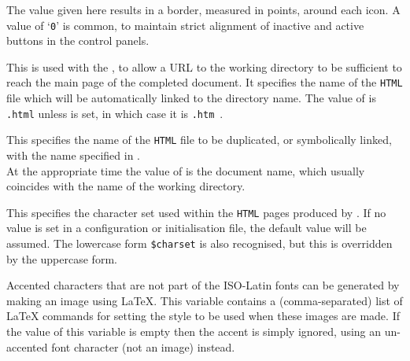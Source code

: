 \begin{htmllist}
\item [\fn{\$NAV\_BORDER}\texttt{ = }\Meta{num}\texttt{;}]
The value given here results in a border, measured in points, around each icon.\html{\\}
A value of `\texttt{0}' is common, to maintain strict
alignment of inactive and active buttons in the control panels.


\begin{changebar}
\item [\fn{\$LINKNAME}\texttt{ = '\char34index.\$EXTN\char34';}]
This is used with the  , 
to allow a URL to the working directory to be sufficient to reach the main page 
of the completed document. 
It specifies the name of the \texttt{HTML} file which will be automatically
linked to the directory name.\html{\\}
The value of  is \texttt{.html} unless  is set, 
in which case it is \texttt{.htm}~. 

\item [\fn{\$LINKPOINT}\texttt{ = '\char34\$FILE\$EXTN\char34';}]
This specifies the name of the \texttt{HTML} file to be duplicated, or symbolically
linked, with the name specified in .\\
At the appropriate time the value of  is the document name, 
which usually coincides with the name of the working directory.

%
%
\item [\fn{\$CHARSET}\texttt{ = 'iso\_8859\_1';}\label{charset}]
This specifies the character set used within the \texttt{HTML} pages
produced by \latextohtml. If no value is set in a configuration
or initialisation file, the default value will be assumed.
The lowercase form \texttt{\$charset} is also recognised, but
this is overridden by the uppercase form.

%
\item [ \fn{\$ACCENT\_IMAGES}\texttt{ = 'large'};]
Accented characters that are not part of the ISO-Latin fonts
can be generated by making an image using \LaTeX.
This variable contains a (comma-separated) list of \LaTeX{} commands
for setting the style to be used when these images are made. 
If the value of this variable is empty then the accent is simply
ignored, using an un-accented font character (not an image) instead.
\end{changebar}
%
\end{htmllist}

